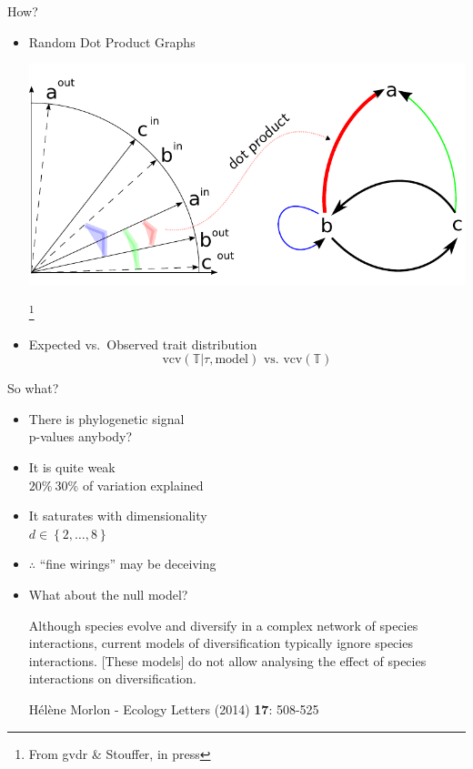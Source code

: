 \documentclass[]{beamer}
\begin{document}
\begin{frame}{How?}

\begin{itemize}[<+->]
\centering
\item
Random Dot Product Graphs

  \includegraphics[width=0.8\linewidth]{images/RDPGmodel.pdf}

\footnote{From gvdr \& Stouffer, in press}

\item
Expected vs.~Observed trait distribution
  \begin{equation*}
    \textrm{vcv}\left( \mathbb{T} | \tau, \mbox{model} \right) \mbox{ vs. } \textrm{vcv}\left(\mathbb{T}\right)
  \end{equation*}

\end{itemize}

\end{frame}

\begin{frame}{So what?}

\begin{itemize}[<+->]
\itemsep1pt\parskip0pt
\item
  There is phylogenetic signal\\
  {\tiny p-values anybody?}
\item
  It is quite weak\\
  {\tiny $20\% ~ 30\%$ of variation explained}
\item
  It saturates with dimensionality\\
  {\tiny $d \in \left\{2, \dots , 8 \right\}$}
\item
  $\therefore$ ``fine wirings'' may be deceiving
\item
What about the null model?

{\em
{\scriptsize Although species evolve and diversify in a complex network of species interactions, current models of diversification typically ignore species interactions. [These models] do not allow analysing the effect of species interactions on diversification.

H\'{e}l\`{e}ne Morlon - \textrm{Ecology Letters} (2014) \textbf{17}: 508-525}
}
\end{itemize}

\end{frame}
\end{document}
